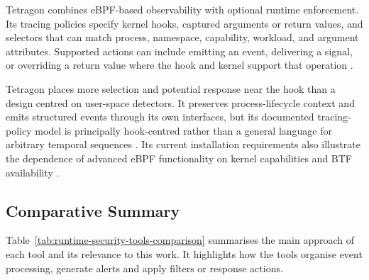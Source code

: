 Tetragon combines eBPF-based observability with optional runtime enforcement.
Its tracing policies specify kernel hooks, captured arguments or return values,
and selectors that can match process, namespace, capability, workload, and
argument attributes. Supported actions can include emitting an event,
delivering a signal, or overriding a return value where the hook and kernel
support that operation \cite{cilium_tetragon_tracing_policy,
cilium_tetragon_selectors,cilium_tetragon_enforcement}.

Tetragon places more selection and potential response near the hook than a
design centred on user-space detectors. It preserves
process-lifecycle context and emits structured events through its own
interfaces, but its documented tracing-policy model is principally
hook-centred rather than a general language for arbitrary temporal sequences
\cite{cilium_tetragon_events,cilium_tetragon_tracing_policy}. Its current
installation requirements also illustrate the dependence of advanced eBPF
functionality on kernel capabilities and BTF availability
\cite{cilium_tetragon_requirements}.

\subsection{Comparative Summary}
\label{subsec:runtime-tools-comparison}

Table~\ref{tab:runtime-security-tools-comparison} summarises the main
approach of each tool and its relevance to this work. It highlights how
the tools organise event processing, generate alerts and apply filters
or response actions.

